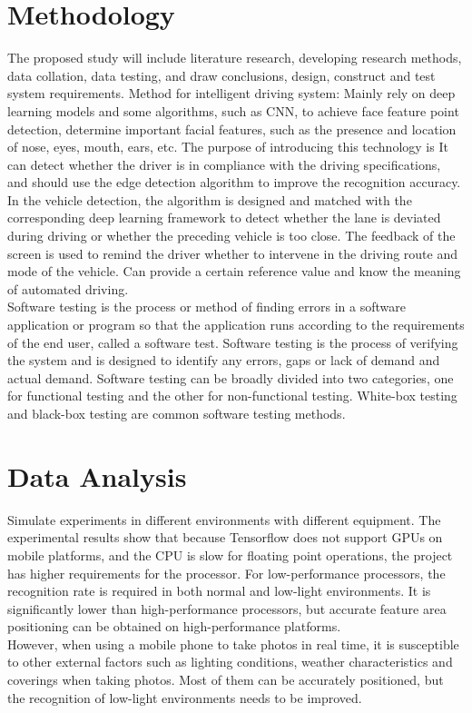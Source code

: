 \documentclass[12pt, a4paper]{article}
\begin{document}
\section{Methodology}
The proposed study will include literature research, developing research methods, data collation, data testing, and draw conclusions, design, construct and test system requirements. Method for intelligent driving system: Mainly rely on deep learning models and some algorithms, such as CNN, to achieve face feature point detection, determine important facial features, such as the presence and location of nose, eyes, mouth, ears, etc. The purpose of introducing this technology is It can detect whether the driver is in compliance with the driving specifications, and should use the edge detection algorithm to improve the recognition accuracy. In the vehicle detection, the algorithm is designed and matched with the corresponding deep learning framework to detect whether the lane is deviated during driving or whether the preceding vehicle is too close. The feedback of the screen is used to remind the driver whether to intervene in the driving route and mode of the vehicle. Can provide a certain reference value and know the meaning of automated driving.\\
Software testing is the process or method of finding errors in a software application or program so that the application runs according to the requirements of the end user, called a software test. Software testing is the process of verifying the system and is designed to identify any errors, gaps or lack of demand and actual demand. Software testing can be broadly divided into two categories, one for functional testing and the other for non-functional testing. White-box testing and black-box testing are common software testing methods.

\section{Data Analysis}
Simulate experiments in different environments with different equipment. The experimental results show that because Tensorflow does not support GPUs on mobile platforms, and the CPU is slow for floating point operations, the project has higher requirements for the processor. For low-performance processors, the recognition rate is required in both normal and low-light environments. It is significantly lower than high-performance processors, but accurate feature area positioning can be obtained on high-performance platforms.
\\However, when using a mobile phone to take photos in real time, it is susceptible to other external factors such as lighting conditions, weather characteristics and coverings when taking photos. Most of them can be accurately positioned, but the recognition of low-light environments needs to be improved.
\end{document}
